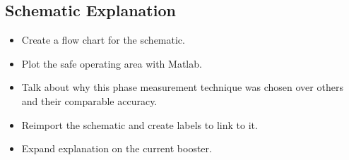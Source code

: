 \subsection{Schematic Explanation}
\begin{itemize}
    \item Create a flow chart for the schematic.
    \item Plot the safe operating area with Matlab.
    \item Talk about why this phase measurement technique was chosen over others and their comparable accuracy.
    \item Reimport the schematic and create labels to link to it.
    \item Expand explanation on the current booster.
\end{itemize}

